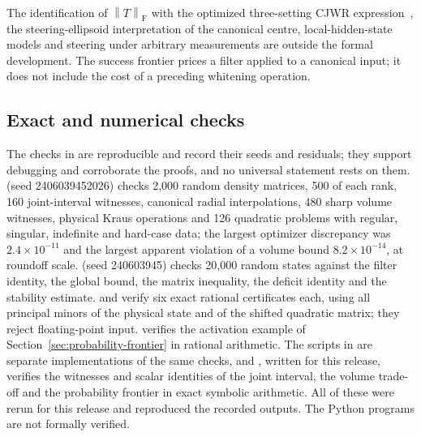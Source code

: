\documentclass[11pt,a4paper]{article}
\theoremstyle{remark}\newtheorem{remark}[theorem]{Remark}
\newcommand{\norm}[1]{\left\lVert#1\right\rVert}
\begin{document}
The identification of $\norm T_{\mathrm F}$ with the optimized
three-setting CJWR expression~\cite{costa}, the steering-ellipsoid
interpretation of the canonical centre, local-hidden-state models and
steering under arbitrary measurements are outside the formal development.
The success frontier prices a filter applied to a canonical input; it does
not include the cost of a preceding whitening operation.

\subsection{Exact and numerical checks}
The checks in  are reproducible and record their seeds
and residuals; they support debugging and corroborate the proofs, and no
universal statement rests on them. 
(seed 2406039452026) checks 2{,}000 random density matrices, 500 of each
rank, 160 joint-interval witnesses, canonical radial interpolations, 480
sharp volume witnesses, physical Kraus operations and 126 quadratic
problems with regular, singular, indefinite and hard-case data; the
largest optimizer discrepancy was $2.4\times10^{-11}$ and the largest
apparent violation of a volume bound $8.2\times10^{-14}$, at roundoff
scale.  (seed 240603945) checks 20{,}000
random states against the filter identity, the global bound, the matrix
inequality, the deficit identity and the stability estimate.
 and
 verify six exact rational
certificates each, using all principal minors of the physical state and of
the shifted quadratic matrix; they reject floating-point input.
 verifies the activation
example of Section~\ref{sec:probability-frontier} in rational arithmetic.
The scripts in  are separate
implementations of the same checks, and
, written for this
release, verifies the witnesses and scalar identities of the joint
interval, the volume trade-off and the probability frontier in exact
symbolic arithmetic. All of these were rerun for this release and
reproduced the recorded outputs. The Python programs are not formally
verified.
\end{document}
